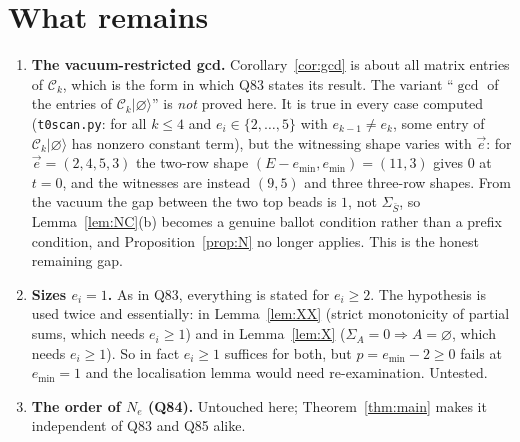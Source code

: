 \documentclass[11pt]{article}
\theoremstyle{definition}
\newcommand{\Ck}{\mathcal{C}}
\newcommand{\vac}{\varnothing}
\begin{document}
\section{What remains}\label{sec:gaps}

\begin{enumerate}
\item \textbf{The vacuum-restricted gcd.}  Corollary~\ref{cor:gcd} is about all matrix
entries of $\Ck_k$, which is the form in which Q83 states its result.  The variant
``$\gcd$ of the entries of $\Ck_k|\vac\rangle$'' is \emph{not} proved here.  It is true
in every case computed (\texttt{t0scan.py}: for all $k\le4$ and $e_i\in\{2,\dots,5\}$
with $e_{k-1}\ne e_k$, some entry of $\Ck_k|\vac\rangle$ has nonzero constant term), but
the witnessing shape varies with $\vec e$: for $\vec e=(2,4,5,3)$ the two-row shape
$(E-e_{\min},e_{\min})=(11,3)$ gives $0$ at $t=0$, and the witnesses are instead
$(9,5)$ and three three-row shapes.  From the vacuum the gap between the two top beads is
$1$, not $\Sigma_{\bar S}$, so Lemma~\ref{lem:NC}(b) becomes a genuine ballot condition
rather than a prefix condition, and Proposition~\ref{prop:N} no longer applies.  This is
the honest remaining gap.
\item \textbf{Sizes $e_i=1$.}  As in Q83, everything is stated for $e_i\ge2$.  The
hypothesis is used twice and essentially: in Lemma~\ref{lem:XX} (strict monotonicity of
partial sums, which needs $e_i\ge1$) and in Lemma~\ref{lem:X} ($\Sigma_A=0\Rightarrow
A=\varnothing$, which needs $e_i\ge1$).  So in fact $e_i\ge1$ suffices for both, but
$p=e_{\min}-2\ge0$ fails at $e_{\min}=1$ and the localisation lemma would need
re-examination.  Untested.
\item \textbf{The order of $N_e$ (Q84).}  Untouched here; Theorem~\ref{thm:main} makes it
independent of Q83 and Q85 alike.
\end{enumerate}
\end{document}
